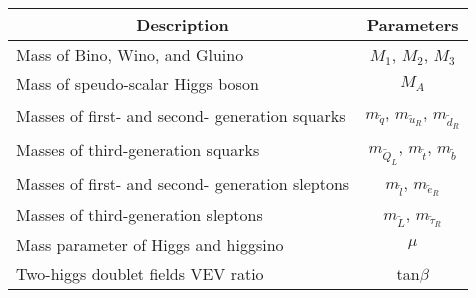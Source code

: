 %
\begin{tabular}{lc}\hline
\multicolumn{1}{c}{\textbf{Description}} & \textbf{Parameters} \\ \hline \hline
Mass of Bino, Wino, and Gluino & $M_1$, $M_2$, $M_3$ \\
Mass of speudo-scalar Higgs boson & $M_A$ \\ 
Masses of first- and second- generation squarks & $m_{\tilde{q}}$, $m_{\tilde{u}_R}$, $m_{\tilde{d}_R}$ \\ 
Masses of third-generation squarks & $m_{\tilde{Q}_L}$, $m_{\tilde{t}}$, $m_{\tilde{b}}$ \\ 
Masses of first- and second- generation sleptons & $m_{\tilde{l}}$, $m_{\tilde{e}_R}$ \\ 
Masses of third-generation sleptons & $m_{\tilde{L}}$, $m_{\tilde{\tau}_R}$ \\ 
Mass parameter of Higgs and higgsino & $\mu$ \\
Two-higgs doublet fields \ac{VEV} ratio & tan$\beta$ \\ \hline
\end{tabular}
%
%